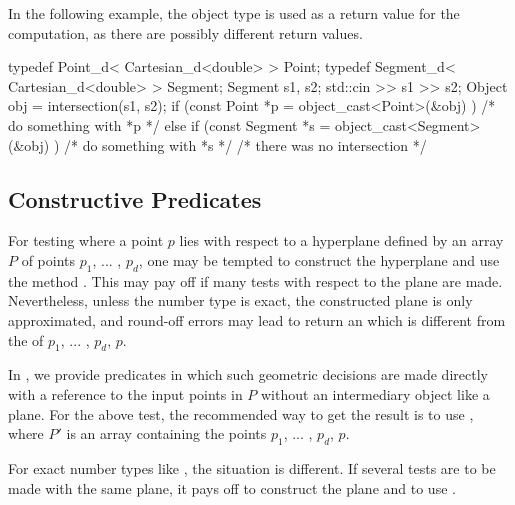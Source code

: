 \ccExample 
In the following example, the object type is used as a return value for
the  computation, as there are
possibly different return values.
\ccHtmlLinksOff%
\begin{cprog}
  typedef Point_d< Cartesian_d<double> >    Point;
  typedef Segment_d< Cartesian_d<double> >  Segment;
  Segment s1, s2;
  std::cin >> s1 >> s2;
  Object obj = intersection(s1, s2);
  if (const Point *p = object_cast<Point>(&obj) ) {
    /* do something with *p */
  } else if (const Segment *s = object_cast<Segment>(&obj) ) {
    /* do something with *s */
  }
  /*  there was no intersection */
\end{cprog}
\ccHtmlLinksOn%

\subsection{Constructive Predicates}
For testing where a point $p$ lies with respect to a hyperplane
defined by an array $P$ of points $p_1$, ... , $p_d$, one may be
tempted to construct the hyperplane  and
use the method .  This may pay off if many tests
with respect to the plane are made.  Nevertheless, unless the number
type is exact, the constructed plane is only approximated, and
round-off errors may lead  to return an
 which is different from the
 of $p_1$, ... , $p_d$, $p$.

In {\cgal}, we provide predicates in which such geometric decisions
are made directly with a reference to the input points in $P$ without
an intermediary object like a plane.  For the above test, the
recommended way to get the result is to use
, where $P'$ is an array containing the
points $p_1$, ... , $p_d$, $p$.

For exact number types like , the situation is
different. If several tests are to be made with the same plane, it
pays off to construct the plane and to use .

